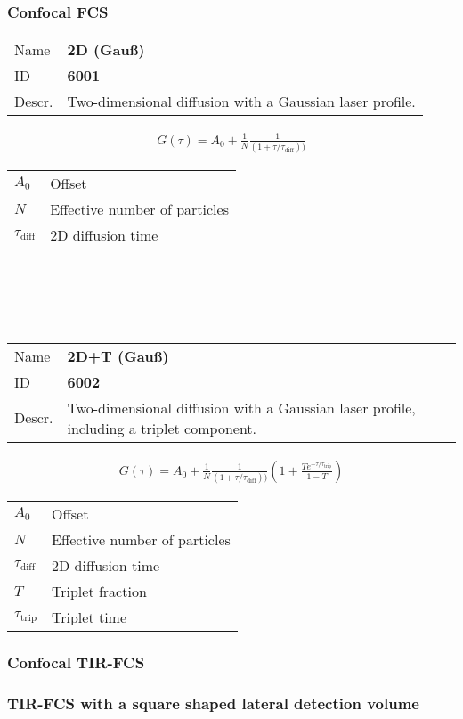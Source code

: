 \subsubsection{Confocal FCS}

\begin{samepage}
\noindent \begin{tabular}{lp{}}
Name & \textbf{2D (Gauß)} \\ 
ID & \textbf{6001} \\ 
Descr. &  Two-dimensional diffusion with a Gaussian laser profile. \\ 
\end{tabular}
\begin{align}
G(\tau) = A_0 + \frac{1}{N} \frac{1}{(1+\tau/\tau_\mathrm{diff}) )}
\end{align} 
\begin{center}
\begin{tabular}{ll}
$A_0$ & Offset \\ 
$N$ & Effective number of particles \\ 
$\tau_\mathrm{diff}$ &  2D diffusion time \\ 
\end{tabular} \\
\end{center}
\vspace{2em}
\end{samepage}
\\
\\

\begin{samepage}
\noindent \begin{tabular}{lp{}}
Name & \textbf{2D+T (Gauß)} \\ 
ID & \textbf{6002} \\ 
Descr. &  Two-dimensional diffusion with a Gaussian laser profile, including a triplet component. \\ 
\end{tabular}
\begin{align}
G(\tau) = A_0 + \frac{1}{N} \frac{1}{(1+\tau/\tau_\mathrm{diff}))}  \left(1 + \frac{T e^{-\tau/\tau_\mathrm{trip}}}{1-T}  \right)
\end{align} 
\begin{center}
\begin{tabular}{ll}
$A_0$ & Offset \\ 
$N$ & Effective number of particles \\ 
$\tau_\mathrm{diff}$ &  2D diffusion time \\ 
$T$ &  Triplet fraction \\ 
$\tau_\mathrm{trip}$ &  Triplet time \\ 
\end{tabular}
\end{center}
\end{samepage}




\subsubsection{Confocal TIR-FCS}

\subsubsection{TIR-FCS with a square shaped lateral detection volume}